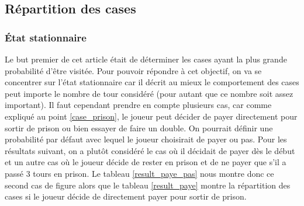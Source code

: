 \documentclass[letterpaper]{article}
\begin{document}
  \subsection{Répartition des cases}
  
    \subsubsection{État stationnaire}
      Le but premier de cet article était de déterminer les cases ayant
      la plus grande probabilité d'être visitée.  Pour pouvoir répondre à 
      cet objectif, on va se concentrer sur l'état stationnaire car il décrit
      au mieux le comportement des cases peut importe le nombre de tour considéré
      (pour autant que ce nombre soit assez important).  Il faut cependant 
      prendre en compte plusieurs cas, car comme expliqué au point \ref{case_prison}, le
      joueur peut décider de payer directement pour sortir de prison ou bien
      essayer de faire un double.  On pourrait définir une probabilité par défaut
      avec lequel le joueur choisirait de payer ou pas.  Pour les résultats suivant,
      on a plutôt considéré le cas où il décidait de payer dès le début et un autre 
      cas où le joueur décide de rester en prison et de ne payer que s'il a passé
      3 tours en prison.  Le tableau \ref{result_paye_pas} nous montre donc ce second
      cas de figure alors que le tableau \ref{result_paye} montre la répartition 
      des cases si le joueur décide de directement payer pour sortir de prison.
    
\end{document}

